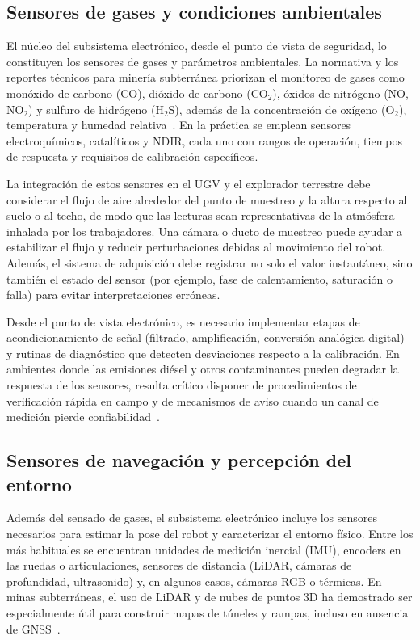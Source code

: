 \subsection{Sensores de gases y condiciones ambientales}

\hspace{1.25cm}
El núcleo del subsistema electrónico, desde el punto de vista de seguridad, lo constituyen los sensores de gases y parámetros ambientales. La normativa y los reportes técnicos para minería subterránea priorizan el monitoreo de gases como monóxido de carbono (CO), dióxido de carbono (CO$_2$), óxidos de nitrógeno (NO, NO$_2$) y sulfuro de hidrógeno (H$_2$S), además de la concentración de oxígeno (O$_2$), temperatura y humedad relativa~\cite{MINEM_DS024_2016,OSINERGMIN_BoletinGSM_2020b,EU_ExposureDirective_2020}. En la práctica se emplean sensores electroquímicos, catalíticos y NDIR, cada uno con rangos de operación, tiempos de respuesta y requisitos de calibración específicos.


La integración de estos sensores en el UGV y el explorador terrestre debe considerar el flujo de aire alrededor del punto de muestreo y la altura respecto al suelo o al techo, de modo que las lecturas sean representativas de la atmósfera inhalada por los trabajadores. Una cámara o ducto de muestreo puede ayudar a estabilizar el flujo y reducir perturbaciones debidas al movimiento del robot. Además, el sistema de adquisición debe registrar no solo el valor instantáneo, sino también el estado del sensor (por ejemplo, fase de calentamiento, saturación o falla) para evitar interpretaciones erróneas.


Desde el punto de vista electrónico, es necesario implementar etapas de acondicionamiento de señal (filtrado, amplificación, conversión analógica-digital) y rutinas de diagnóstico que detecten desviaciones respecto a la calibración. En ambientes donde las emisiones diésel y otros contaminantes pueden degradar la respuesta de los sensores, resulta crítico disponer de procedimientos de verificación rápida en campo y de mecanismos de aviso cuando un canal de medición pierde confiabilidad~\cite{EmisionesDiesel_2021,GEI_MinasPeru_2022}.

\subsection{Sensores de navegación y percepción del entorno}

\hspace{1.25cm}
Además del sensado de gases, el subsistema electrónico incluye los sensores necesarios para estimar la pose del robot y caracterizar el entorno físico. Entre los más habituales se encuentran unidades de medición inercial (IMU), encoders en las ruedas o articulaciones, sensores de distancia (LiDAR, cámaras de profundidad, ultrasonido) y, en algunos casos, cámaras RGB o térmicas. En minas subterráneas, el uso de LiDAR y de nubes de puntos 3D ha demostrado ser especialmente útil para construir mapas de túneles y rampas, incluso en ausencia de GNSS~\cite{KimChoi_2025_MineMapping}.

